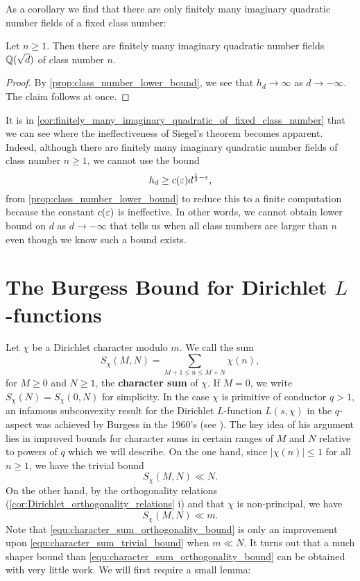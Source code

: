     As a corollary we find that there are only finitely many imaginary quadratic number fields of a fixed class number:

    \begin{corollary}\label{cor:finitely_many_imaginary_quadratic_of_fixed_class_number}
      Let $n \ge 1$. Then there are finitely many imaginary quadratic number fields $\mathbb{Q}(\sqrt{d})$ of class number $n$.
    \end{corollary}
    \begin{proof}
      By \cref{prop:class_number_lower_bound}, we see that $h_{d} \to \infty$ as $d \to -\infty$. The claim follows at once.
    \end{proof}

    It is in \cref{cor:finitely_many_imaginary_quadratic_of_fixed_class_number} that we can see where the ineffectiveness of Siegel's theorem becomes apparent. Indeed, although there are finitely many imaginary quadratic number fields of class number $n \ge 1$, we cannot use the bound
    \[
      h_{d} \ge c(\varepsilon)d^{\frac{1}{2}-\varepsilon},
    \]
    from \cref{prop:class_number_lower_bound} to reduce this to a finite computation because the constant $c(\varepsilon)$ is ineffective. In other words, we cannot obtain lower bound on $d$ as $d \to -\infty$ that tells us when all class numbers are larger than $n$ even though we know such a bound exists.
  \section{The Burgess Bound for Dirichlet \texorpdfstring{$L$}{L}-functions}
    Let $\chi$ be a Dirichlet character modulo $m$. We call the sum
    \[
      S_{\chi}(M,N) = \sum_{M+1 \le n \le M+N}\chi(n),
    \]
    for $M \ge 0$ and $N \ge 1$, the \textbf{character sum} of $\chi$. If $M = 0$, we write $S_{\chi}(N) = S_{\chi}(0,N)$ for simplicity. In the case $\chi$ is primitive of conductor $q > 1$, an infamous subconvexity result for the Dirichlet $L$-function $L(s,\chi)$ in the $q$-aspect was achieved by Burgess in the 1960's (see \cite{burgess1963character}). The key idea of his argument lies in improved bounds for character sums in certain ranges of $M$ and $N$ relative to powers of $q$ which we will describe. On the one hand, since $|\chi(n)| \le 1$ for all $n \ge 1$, we have the trivial bound
    \begin{equation}\label{equ:character_sum_trivial_bound}
      S_{\chi}(M,N) \ll N.
    \end{equation}
    On the other hand, by the orthogonality relations (\cref{cor:Dirichlet_orthogonality_relations} i) and that $\chi$ is non-principal, we have
    \begin{equation}\label{equ:character_sum_orthogonality_bound}
      S_{\chi}(M,N) \ll m.
    \end{equation}
    Note that \cref{equ:character_sum_orthogonality_bound} is only an improvement upon \cref{equ:character_sum_trivial_bound} when $m \ll N$. It turns out that a much shaper bound than \cref{equ:character_sum_orthogonality_bound} can be obtained with very little work. We will first require a small lemma:

